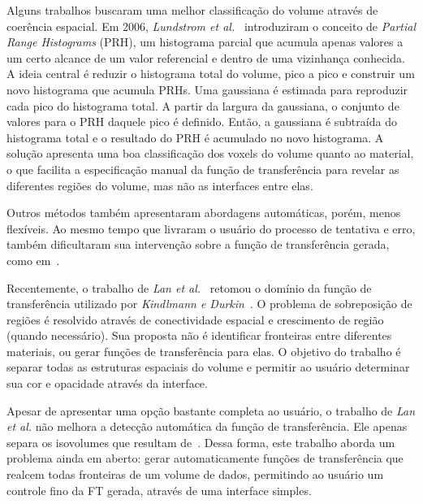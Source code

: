 	Alguns trabalhos buscaram uma melhor classificação do volume através de coerência espacial. Em 2006, \textit{Lundstrom et al.}~\cite{lundstrom1} introduziram o conceito de \textit{Partial Range Histograms} (PRH), um histograma parcial que acumula apenas valores a um certo alcance de um valor referencial e dentro de uma vizinhança conhecida. A ideia central é reduzir o histograma total do volume, pico a pico e construir um novo histograma que acumula PRHs. Uma gaussiana é estimada para reproduzir cada pico do histograma total. A partir da largura da gaussiana, o conjunto de valores para o PRH daquele pico é definido. Então, a gaussiana é subtraída do histograma total e o resultado do PRH é acumulado no novo histograma. A solução apresenta uma boa classificação dos voxels do volume quanto ao material, o que facilita a especificação manual da função de transferência para revelar as diferentes regiões do volume, mas não as interfaces entre elas.
	
	Outros métodos também apresentaram abordagens automáticas, porém, menos flexíveis. Ao mesmo tempo que livraram o usuário do processo de tentativa e erro, também dificultaram sua intervenção sobre a função de transferência gerada, como em~\cite{ruiz, zhou}.
	
	Recentemente, o trabalho de \textit{Lan et al.}~\cite{lan} retomou o domínio da função de transferência utilizado por \textit{Kindlmann e Durkin}~\cite{gordon}. O problema de sobreposição de regiões é resolvido através de conectividade espacial e crescimento de região (quando necessário). Sua proposta não é identificar fronteiras entre diferentes materiais, ou gerar funções de transferência para elas. O objetivo do trabalho é separar todas as estruturas espaciais do volume e permitir ao usuário determinar sua cor e opacidade através da interface.
	
	Apesar de apresentar uma opção bastante completa ao usuário, o trabalho de \textit{Lan et al.} não melhora a detecção automática da função de transferência. Ele apenas separa os isovolumes que resultam de~\cite{gordon, kniss1, kniss2}. Dessa forma, este trabalho aborda um problema ainda em aberto: gerar automaticamente funções de transferência que realcem todas fronteiras de um volume de dados, permitindo ao usuário um controle fino da FT gerada, através de uma interface simples.